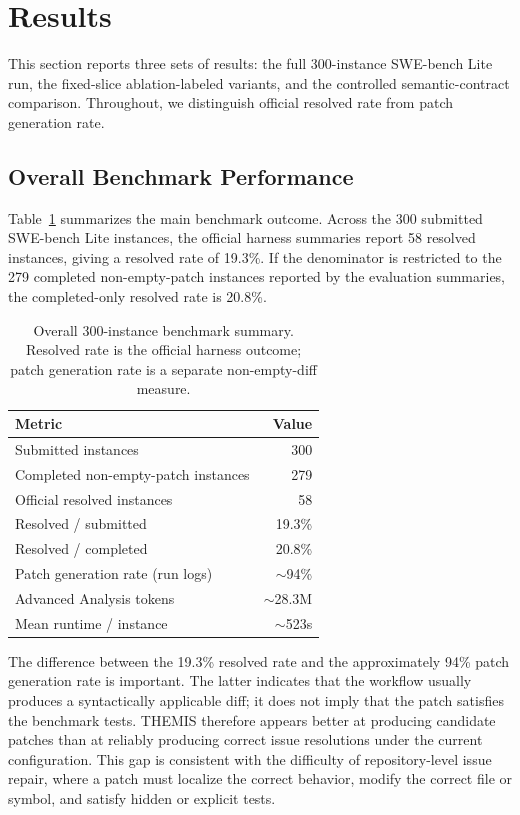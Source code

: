 \documentclass[11pt]{article}
\begin{document}
\section{Results}
\label{sec:results}

This section reports three sets of results: the full 300-instance SWE-bench Lite run, the fixed-slice ablation-labeled variants, and the controlled semantic-contract comparison.  Throughout, we distinguish official resolved rate from patch generation rate.

\subsection{Overall Benchmark Performance}
\label{subsec:overall-results}

Table~\ref{tab:overall-results} summarizes the main benchmark outcome.  Across the 300 submitted SWE-bench Lite instances, the official harness summaries report 58 resolved instances, giving a resolved rate of 19.3\%.  If the denominator is restricted to the 279 completed non-empty-patch instances reported by the evaluation summaries, the completed-only resolved rate is 20.8\%.

\begin{table}[t]
\centering
\small
\begin{tabular}{lr}
\toprule
Metric & Value \\
\midrule
Submitted instances & 300 \\
Completed non-empty-patch instances & 279 \\
Official resolved instances & 58 \\
Resolved / submitted & 19.3\% \\
Resolved / completed & 20.8\% \\
Patch generation rate (run logs) & $\sim$94\% \\
Advanced Analysis tokens & $\sim$28.3M \\
Mean runtime / instance & $\sim$523s \\
\bottomrule
\end{tabular}
\caption{Overall 300-instance benchmark summary.  Resolved rate is the official harness outcome; patch generation rate is a separate non-empty-diff measure.}
\label{tab:overall-results}
\end{table}

The difference between the 19.3\% resolved rate and the approximately 94\% patch generation rate is important.  The latter indicates that the workflow usually produces a syntactically applicable diff; it does not imply that the patch satisfies the benchmark tests.  THEMIS therefore appears better at producing candidate patches than at reliably producing correct issue resolutions under the current configuration.  This gap is consistent with the difficulty of repository-level issue repair, where a patch must localize the correct behavior, modify the correct file or symbol, and satisfy hidden or explicit tests.
\end{document}
